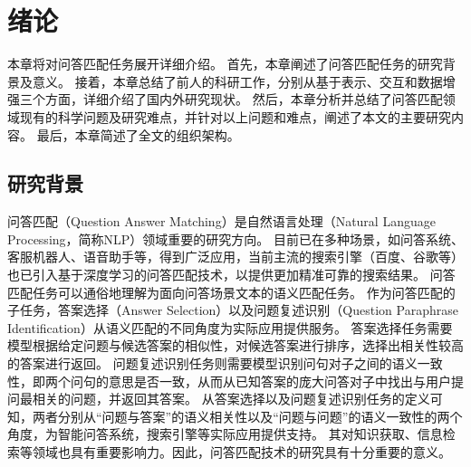 \chapter{绪论}

本章将对问答匹配任务展开详细介绍。
首先，本章阐述了问答匹配任务的研究背景及意义。
接着，本章总结了前人的科研工作，分别从基于表示、交互和数据增强三个方面，详细介绍了国内外研究现状。
然后，本章分析并总结了问答匹配领域现有的科学问题及研究难点，并针对以上问题和难点，阐述了本文的主要研究内容。
最后，本章简述了全文的组织架构。

\section{研究背景}


问答匹配（Question Answer Matching）是自然语言处理（Natural Language Processing，简称NLP）领域重要的研究方向。
目前已在多种场景，如问答系统、客服机器人、语音助手等，得到广泛应用，当前主流的搜索引擎（百度、谷歌等）也已引入基于深度学习的问答匹配技术，以提供更加精准可靠的搜索结果。
问答匹配任务可以通俗地理解为面向问答场景文本的语义匹配任务。
作为问答匹配的子任务，答案选择（Answer Selection）以及问题复述识别（Question Paraphrase Identification）从语义匹配的不同角度为实际应用提供服务。
答案选择任务需要模型根据给定问题与候选答案的相似性，对候选答案进行排序，选择出相关性较高的答案进行返回。
问题复述识别任务则需要模型识别问句对子之间的语义一致性，即两个问句的意思是否一致，从而从已知答案的庞大问答对子中找出与用户提问最相关的问题，并返回其答案。
从答案选择以及问题复述识别任务的定义可知，两者分别从“问题与答案”的语义相关性以及“问题与问题”的语义一致性的两个角度，为智能问答系统，搜索引擎等实际应用提供支持。
其对知识获取、信息检索等领域也具有重要影响力。因此，问答匹配技术的研究具有十分重要的意义。

